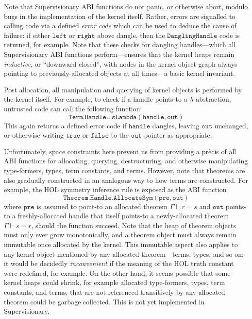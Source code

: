 \documentclass[sigplan, review]{acmart}
\begin{document}
Note that Supervisionary ABI functions do not panic, or otherwise abort, modulo bugs in the implementation of the kernel itself.
Rather, errors are signalled to calling code via a defined \emph{error code} which can be used to deduce the cause of failure: if either $\mathtt{left}$ or $\mathtt{right}$ above dangle, then the $\mathtt{DanglingHandle}$ code is returned, for example.
Note that these checks for dangling handles---which all Supervisionary ABI functions perform---ensures that the kernel heaps remain \emph{inductive}, or ``downward closed'', with nodes in the kernel object graph always pointing to previously-allocated objects at all times---a basic kernel invariant.

Post allocation, all manipulation and querying of kernel objects is performed by the kernel itself.
For example, to check if a handle points-to a $\lambda$-abstraction, untrusted code can call the following function:
\begin{displaymath}
\mathtt{Term.Handle.IsLambda(handle, out)}
\end{displaymath}
This again returns a defined error code if $\mathtt{handle}$ dangles, leaving $\mathtt{out}$ unchanged, or otherwise writing $\mathtt{true}$ or $\mathtt{false}$ to the $\mathtt{out}$ pointer as appropriate.

Unfortunately, space constraints here prevent us from providing a pr\`{e}cis of all ABI functions for allocating, querying, destructuring, and otherwise manipulating type-formers, types, term constants, and terms.
However, note that theorems are also gradually constructed in an analogous way to how terms are constructed.
For example, the HOL symmetry inference rule is exposed as the ABI function
\begin{displaymath}
\mathtt{Theorem.Handle.AllocateSym(pre, out)}
\end{displaymath}
where $\mathtt{pre}$ is assumed to point-to an allocated theorem $\Gamma \vdash r = s$ and $\mathtt{out}$ points-to a freshly-allocated handle that itself points-to a newly-allocated theorem $\Gamma \vdash s = r$, should the function succeed.
Note that the heap of theorem objects must only ever grow monotonically, and a theorem object must always remain immutable once allocated by the kernel.
This immutable aspect also applies to any kernel object mentioned by any allocated theorem---terms, types, and so on: it would be decidedly \emph{inconvenient} if the meaning of the HOL truth constant were redefined, for example.
On the other hand, it seems possible that some kernel heaps could shrink, for example allocated type-formers, types, term constants, and terms, that are not referenced transitively by any allocated theorem could be garbage collected.
This is not yet implemented in Supervisionary.
\end{document}

